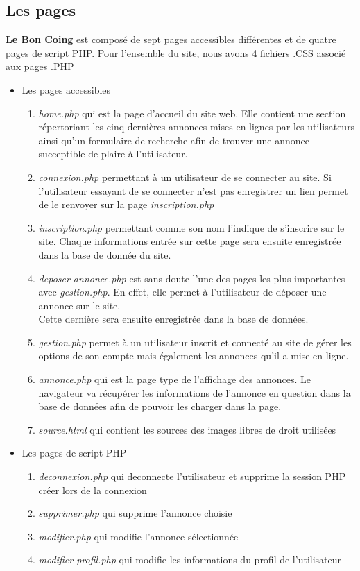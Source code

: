 \documentclass[11pt,a4paper]{article}
\begin{document}
\subsection{Les pages}
\textbf{Le Bon Coing} est composé de sept pages accessibles différentes et de quatre pages de script PHP. Pour l'ensemble du site, nous avons 4 fichiers .CSS associé aux pages .PHP
\begin{itemize}
    \item Les pages accessibles
    \begin{enumerate}
        \item \emph{home.php} qui est la page d'accueil du site web. Elle contient une section répertoriant les cinq dernières annonces mises en lignes par les utilisateurs ainsi qu'un formulaire de recherche afin de trouver une annonce succeptible de plaire à l'utilisateur.
        \item \emph{connexion.php} permettant à un utilisateur de se connecter au site. Si l'utilisateur essayant de se connecter n'est pas enregistrer un lien permet de le renvoyer sur la page \emph{inscription.php}
        \item \emph{inscription.php} permettant comme son nom l'indique de s'inscrire sur le site. Chaque informations entrée sur cette page sera ensuite enregistrée dans la base de donnée du site.
        \item \emph{deposer-annonce.php} est sans doute l'une des pages les plus importantes avec \emph{gestion.php}. En effet, elle permet à l'utilisateur de déposer une annonce sur le site.\\ Cette dernière sera ensuite enregistrée dans la base de données.
        \item \emph{gestion.php} permet à un utilisateur inscrit et connecté au site de gérer les options de son compte mais également les annonces qu'il a mise en ligne.
        \item \emph{annonce.php} qui est la page type de l'affichage des annonces. Le navigateur va récupérer les informations de l'annonce en question dans la base de données afin de pouvoir les charger dans la page.
        \item \emph{source.html} qui contient les sources des images libres de droit utilisées
    \end{enumerate}
    \item Les pages de script PHP
    \begin{enumerate}
        \item \emph{deconnexion.php} qui deconnecte l'utilisateur et supprime la session PHP créer lors de la connexion
        \item \emph{supprimer.php} qui supprime l'annonce choisie
        \item \emph{modifier.php} qui modifie l'annonce sélectionnée
        \item \emph{modifier-profil.php} qui modifie les informations du profil de l'utilisateur
    \end{enumerate}
\end{itemize}
\end{document}
